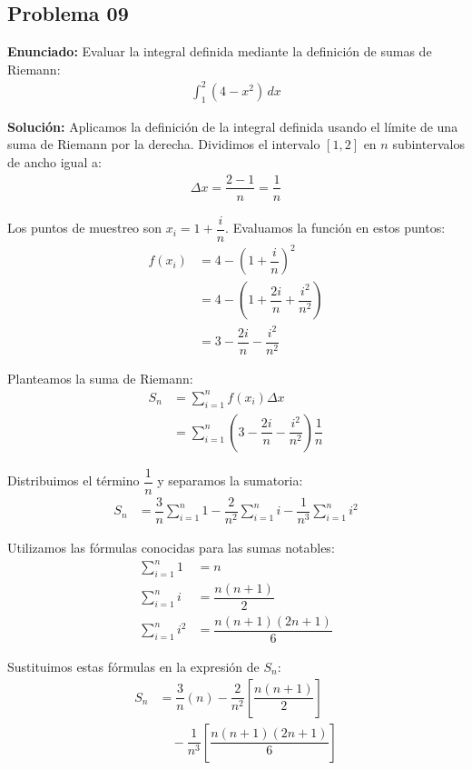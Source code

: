 \subsection*{Problema 09}

\textbf{Enunciado:} Evaluar la integral definida 
mediante la definición de sumas de Riemann:
\begin{align*}
\int_{1}^{2} (4 - x^2) \, dx
\end{align*}

\textbf{Solución:} 
Aplicamos la definición de la integral definida 
usando el límite de una suma de Riemann por la 
derecha. Dividimos el intervalo $[1, 2]$ en $n$ 
subintervalos de ancho igual a:
\begin{align*}
\Delta x = \dfrac{2 - 1}{n} = \dfrac{1}{n}
\end{align*}

Los puntos de muestreo son $x_i = 1 + \dfrac{i}{n}$. 
Evaluamos la función en estos puntos:
\begin{align*}
f(x_i) &= 4 - \left(1 + \dfrac{i}{n}\right)^2 \\
&= 4 - \left(1 + \dfrac{2i}{n} + \dfrac{i^2}{n^2}\right) \\
&= 3 - \dfrac{2i}{n} - \dfrac{i^2}{n^2}
\end{align*}

Planteamos la suma de Riemann:
\begin{align*}
S_n &= \sum_{i=1}^{n} f(x_i) \Delta x \\
&= \sum_{i=1}^{n} \left(3 - \dfrac{2i}{n} - \dfrac{i^2}{n^2}\right) \dfrac{1}{n}
\end{align*}

Distribuimos el término $\dfrac{1}{n}$ y 
separamos la sumatoria:
\begin{align*}
S_n &= \dfrac{3}{n}\sum_{i=1}^{n} 1 
- \dfrac{2}{n^2}\sum_{i=1}^{n} i 
- \dfrac{1}{n^3}\sum_{i=1}^{n} i^2
\end{align*}

Utilizamos las fórmulas conocidas para las 
sumas notables:
\begin{align*}
\sum_{i=1}^{n} 1 &= n \\
\sum_{i=1}^{n} i &= \dfrac{n(n+1)}{2} \\
\sum_{i=1}^{n} i^2 &= \dfrac{n(n+1)(2n+1)}{6}
\end{align*}

Sustituimos estas fórmulas en la expresión 
de $S_n$:
\begin{align*}
S_n &= \dfrac{3}{n}(n) 
- \dfrac{2}{n^2}\left[\dfrac{n(n+1)}{2}\right] \\
&\quad - \dfrac{1}{n^3}\left[\dfrac{n(n+1)(2n+1)}{6}\right]
\end{align*}

